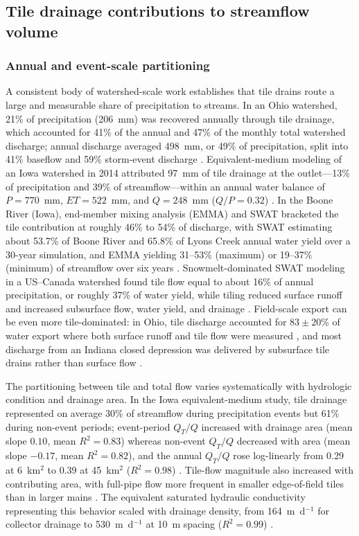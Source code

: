\documentclass[11pt]{article}
\begin{document}
\subsection{Tile drainage contributions to streamflow volume}

\subsubsection{Annual and event-scale partitioning}

A consistent body of watershed-scale work establishes that tile drains route a large and measurable share of precipitation to streams. In an Ohio watershed, 21\% of precipitation (206~mm) was recovered annually through tile drainage, which accounted for 41\% of the annual and 47\% of the monthly total watershed discharge; annual discharge averaged 498~mm, or 49\% of precipitation, split into 41\% baseflow and 59\% storm-event discharge \parencite{King2014}. Equivalent-medium modeling of an Iowa watershed in 2014 attributed 97~mm of tile drainage at the outlet---13\% of precipitation and 39\% of streamflow---within an annual water balance of $P=770$~mm, $ET=522$~mm, and $Q=248$~mm ($Q/P=0.32$) \parencite{Thomas2016}. In the Boone River (Iowa), end-member mixing analysis (EMMA) and SWAT bracketed the tile contribution at roughly 46\% to 54\% of discharge, with SWAT estimating about 53.7\% of Boone River and 65.8\% of Lyons Creek annual water yield over a 30-year simulation, and EMMA yielding 31--53\% (maximum) or 19--37\% (minimum) of streamflow over six years \parencite{Schilling2019}. Snowmelt-dominated SWAT modeling in a US--Canada watershed found tile flow equal to about 16\% of annual precipitation, or roughly 37\% of water yield, while tiling reduced surface runoff and increased subsurface flow, water yield, and drainage \parencite{Rahman2014}. Field-scale export can be even more tile-dominated: in Ohio, tile discharge accounted for $83\pm20$\% of water export where both surface runoff and tile flow were measured \parencite{Williams2018}, and most discharge from an Indiana closed depression was delivered by subsurface tile drains rather than surface flow \parencite{Williams2019}.

The partitioning between tile and total flow varies systematically with hydrologic condition and drainage area. In the Iowa equivalent-medium study, tile drainage represented on average 30\% of streamflow during precipitation events but 61\% during non-event periods; event-period $Q_T/Q$ increased with drainage area (mean slope $0.10$, mean $R^2=0.83$) whereas non-event $Q_T/Q$ decreased with area (mean slope $-0.17$, mean $R^2=0.82$), and the annual $Q_T/Q$ rose log-linearly from 0.29 at 6~km$^2$ to 0.39 at 45~km$^2$ ($R^2=0.98$) \parencite{Thomas2016}. Tile-flow magnitude also increased with contributing area, with full-pipe flow more frequent in smaller edge-of-field tiles than in larger mains \parencite{King2014}. The equivalent saturated hydraulic conductivity representing this behavior scaled with drainage density, from 164~m~d$^{-1}$ for collector drainage to 530~m~d$^{-1}$ at 10~m spacing ($R^2=0.99$) \parencite{Thomas2016}.
\end{document}

